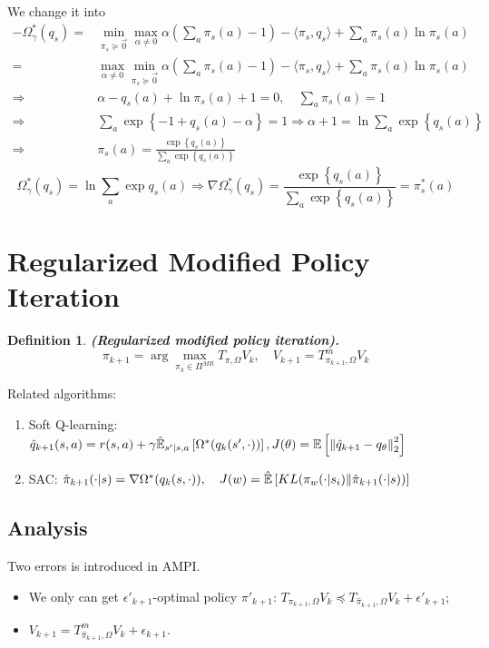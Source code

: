 \documentclass[a4paper]{article}
\newtheorem{definition}{Definition}
\begin{document}
We change it into 
\begin{align*}
    -\Omega^{*}_{\gamma}(q_s) =& \min_{\pi_{s} \succeq \vec{0}} \max_{\alpha \ne 0} \alpha \left(\sum^{}_{a} \pi_s(a) - 1 \right)-\langle \pi_s, q_s \rangle + \sum^{}_{a} \pi_s(a) \ln \pi_s(a)\\
    =& \max_{\alpha \ne 0} \min_{\pi_s \succeq \vec{0}} \alpha \left(\sum^{}_{a} \pi_s(a) - 1 \right)-\langle \pi_s, q_s \rangle + \sum^{}_{a} \pi_s(a) \ln \pi_s(a)\\
    \Rightarrow&  \alpha - q_s(a) + \ln \pi_{s}(a) + 1 = 0,\quad \sum^{}_{a} \pi_{s}(a) = 1 \\
    \Rightarrow& \sum^{}_{a} \exp\left\{ -1 + q_{s}(a) - \alpha \right\} = 1
    \Rightarrow \alpha + 1 = \ln \sum^{}_{a} \exp\left\{ q_s(a) \right\}\\
    \Rightarrow& \pi_s(a) = \frac{\exp \left\{q_{s}(a) \right\}}{\sum^{}_{a} \exp\left\{ q_s(a) \right\}} 
\end{align*}
\[
    \Omega^{*}_{\gamma}(q_s) = \ln \sum^{}_{a} \exp q_s(a) \Rightarrow \nabla \Omega^*_{\gamma}(q_s) = \frac{\exp\left\{ q_s(a) \right\}}{ \sum^{}_{a} \exp\left\{ q_s(a) \right\}} = \pi^*_s(a)
\]

\section{Regularized Modified Policy Iteration}%

\begin{definition}
    \textbf{(Regularized modified policy iteration).}
    \[
        \pi_{k+1} = \arg\max_{\pi_{k} \in \Pi^{MR}} T_{\pi,\Omega}V_{k}, \quad V_{k+1} = T^{m}_{\pi_{k+1}, \Omega} V_k
    \]
\end{definition}

Related algorithms:
\begin{enumerate}
    \item Soft Q-learning: $ \hat q_{k+1}(s,a) = r(s,a) + \gamma \mathbb{\hat E}_{s' | s,a} \left[ \Omega^*(q_k(s',\cdot)) \right] , J(\theta) = \mathbb{E} \left[ {\Arrowvert \hat q_{k+1} - q_{\theta} \Arrowvert}^2_2 \right]$
    \item {SAC}: $ \hat \pi_{k+1}(\cdot | s) = \nabla \Omega^*(q_k(s, \cdot)), \quad J(w) = \mathbb{\hat E} \left[ KL(\pi_{w}(\cdot | s_i) \Arrowvert \hat \pi_{k+1}(\cdot | s))\right]$
\end{enumerate}

\subsection{Analysis}%
Two errors is introduced in {AMPI}.
\begin{itemize}
    \item We only can get $\epsilon'_{k+1}$-optimal policy $ \pi'_{k+1} $: $T_{\pi_{k+1}, \Omega} V_k \preceq T_{\hat\pi_{k+1}, \Omega} V_k + \epsilon'_{k+1} $;
    \item $ V_{k+1} = T^m_{\hat\pi_{k+1}, \Omega} V_k + \epsilon_{k+1} $.
\end{itemize}
\end{document}
